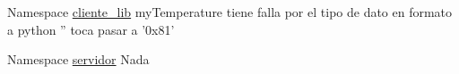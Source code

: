 \label{bug__bug000001}
\hypertarget{bug__bug000001}{}
 
\begin{DoxyDescription}
\item[Namespace \hyperlink{namespacecliente__lib}{cliente\_\-lib} ]myTemperature tiene falla por el tipo de dato en formato a python '' toca pasar a '0x81' 
\end{DoxyDescription}

\label{bug__bug000002}
\hypertarget{bug__bug000002}{}
 
\begin{DoxyDescription}
\item[Namespace \hyperlink{namespaceservidor}{servidor} ]Nada 
\end{DoxyDescription}
